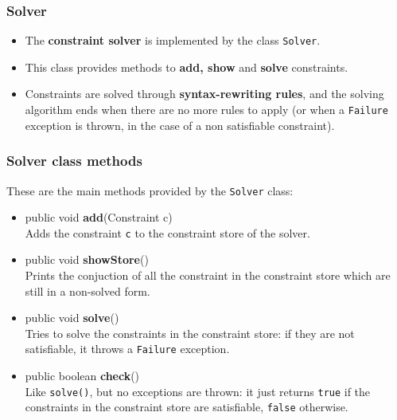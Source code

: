 \begin{frame}[fragile]
\frametitle{Solver}
\begin{itemize}
\setlength\itemsep{2em}
\item The \textbf{constraint solver} is implemented by the class \texttt{Solver}.\\
\item This class provides methods to \textbf{add, show} and \textbf{solve} constraints.\\
\item Constraints are solved through \textbf{syntax-rewriting rules}, and the solving algorithm ends when there are no more rules to apply (or when a \texttt{Failure} exception is thrown, in the case of a non satisfiable constraint).\\
\end{itemize}
\end{frame}

\begin{frame}[fragile]
\frametitle{Solver class methods}
These are the main methods provided by the \texttt{Solver} class:\\
\begin{itemize}
\item public void \textbf{add}(Constraint c)\\ 
Adds the constraint \texttt{c} to the constraint store of the solver.\\
\item public void \textbf{showStore}()\\ 
Prints the conjuction of all the constraint in the constraint store which are still in a non-solved form.\\
\item public void \textbf{solve}()\\ 
Tries to solve the constraints in the constraint store: if they are not satisfiable, it throws a \texttt{Failure} exception.\\
\item public boolean \textbf{check}()\\ 
Like \texttt{solve()}, but no exceptions are thrown: it just returns \texttt{true} if the constraints in the constraint store are satisfiable, \texttt{false} otherwise.\\
\end{itemize}

\end{frame}

